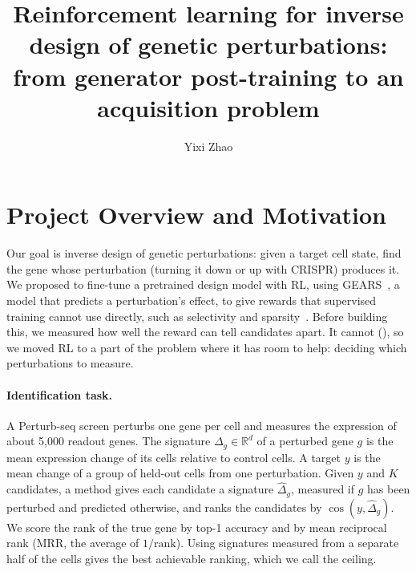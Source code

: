 \documentclass[11pt, letterpaper]{cmu}
\title{Reinforcement learning for inverse design of genetic perturbations: from generator post-training to an acquisition problem}
\author[1]{Yixi Zhao}
\affil[1]{Carnegie Mellon University}
\let\Cref\crtCref
\begin{document}
\maketitle

\section{Project Overview and Motivation}

Our goal is inverse design of genetic perturbations: given a target cell state, find the gene
whose perturbation (turning it down or up with CRISPR) produces it. We proposed to fine-tune a pretrained
design model with RL, using GEARS~\citep{roohani2024gears}, a model that predicts a
perturbation's effect, to give rewards that supervised training cannot use directly, such as
selectivity and sparsity~\citep{olivecrona2017reinvent}. Before building this, we measured how
well the reward can tell candidates apart. It cannot (\Cref{sec:oracle}), so we moved RL to a
part of the problem where it has room to help: deciding which perturbations to measure.

\paragraph{Identification task.} A Perturb-seq screen perturbs one gene per cell and measures
the expression of about 5{,}000 readout genes. The signature $\Delta_g\in\mathbb{R}^d$ of a
perturbed gene $g$ is the mean expression change of its cells relative to control cells. A
target $y$ is the mean change of a group of held-out cells from one perturbation. Given $y$ and
$K$ candidates, a method gives each candidate a signature $\hat\Delta_g$, measured if $g$ has
been perturbed and predicted otherwise, and ranks the candidates by $\cos(y,\hat\Delta_g)$. We
score the rank of the true gene by top-1 accuracy and by mean reciprocal rank (MRR, the average
of $1/\mathrm{rank}$). Using signatures measured from a separate half of the cells gives the best
achievable ranking, which we call the ceiling.
\end{document}
